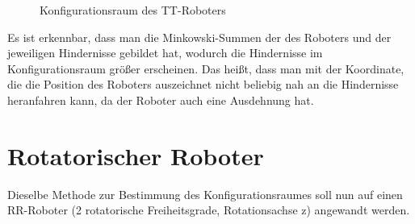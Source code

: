 \documentclass[11pt, a4paper]{article}
\begin{document}
\begin{figure}[H]
\center{}
	\caption{Konfigurationsraum des TT-Roboters}
\end{figure}

Es ist erkennbar, dass man die Minkowski-Summen der des Roboters und der jeweiligen Hindernisse gebildet hat, wodurch die Hindernisse im Konfigurationsraum größer erscheinen. Das heißt, dass man mit der Koordinate, die die Position des Roboters auszeichnet nicht beliebig nah an die Hindernisse heranfahren kann, da der Roboter auch eine Ausdehnung hat.

\section{Rotatorischer Roboter}

Dieselbe Methode zur Bestimmung des Konfigurationsraumes soll nun auf einen RR-Roboter (2 rotatorische Freiheitsgrade, Rotationsachse z) angewandt werden.
\end{document}
